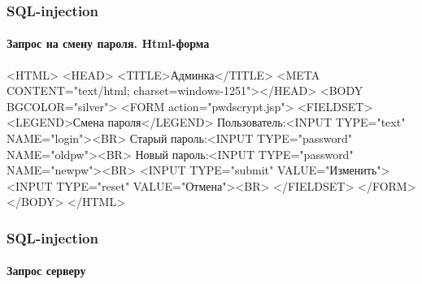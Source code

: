 \begin{frame}[fragile]
    \frametitle{SQL-injection}
    \framesubtitle{Запрос на смену пароля. Html-форма}
    
    \begin{semiverbatim}
<HTML> 
  <HEAD> <TITLE>Админка</TITLE>
    <META CONTENT="text/html; charset=windows-1251"></HEAD>
  <BODY BGCOLOR="silver">
    <FORM action="pwdscrypt.jsp">
      <FIELDSET> <LEGEND>Смена пароля</LEGEND>
        Пользователь:<INPUT TYPE="text" \alert<2>{NAME="login"}><BR>
        Старый пароль:<INPUT TYPE="password" \alert<2>{NAME="oldpw"}><BR>
        Новый пароль:<INPUT TYPE="password" \alert<2>{NAME="newpw"}><BR>
        <INPUT TYPE="submit" VALUE="Изменить"> 
        <INPUT TYPE="reset" VALUE="Отмена"><BR>
      </FIELDSET>
    </FORM>
  </BODY>
</HTML>
    \end{semiverbatim}
\end{frame}

\begin{frame}[fragile]
    \frametitle{SQL-injection}
    \framesubtitle{Запрос серверу}
    
\end{frame}

